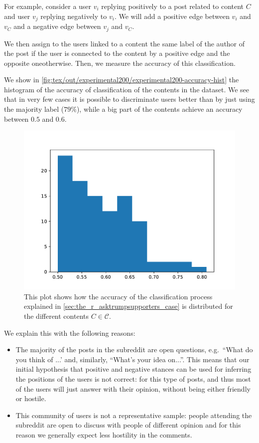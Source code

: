 For example, consider a user $v_i$
replying positively to a post related to content $C$ and user $v_j$ replying
negatively to $v_i$. We will add a positive edge between $v_i$ and $v_C$ and a
negative edge between $v_j$ and $v_C$.

We then assign to the users linked to a content the same label of the author of
the post if the user is connected to the content
by a positive edge and the opposite one\footnotemark otherwise. Then, we measure the accuracy of
this classification.


We show in \autoref{fig:tex/out/experimental200/experimental200-accuracy-hist}
the histogram of the accuracy of classification of the contents in the dataset.
We see that in very few cases it is possible to discriminate users better than
by just using the majority label ($79\%$), while a big part of the contents
achieve an accuracy between $0.5$ and $0.6$.

\begin{figure}
	\centering
	\includegraphics[width=0.6\linewidth]{tex/out/experimental200/experimental200-accuracy-hist.pdf}
	\caption[Distribution of accuracy of classification of r/asktrumpsupporters users for the
		different contents]{This plot shows how the accuracy of the classification
		process explained in \autoref{sec:the_r_asktrumpsupporters_case} is
		distributed for the different contents $C \in \mathcal{C} $.}%
	\label{fig:tex/out/experimental200/experimental200-accuracy-hist}
\end{figure}

We explain this with the following reasons:
\begin{itemize}
	\item The majority of the posts in the subreddit are open questions, e.g.\ ``What
	      do you think of ...' and, similarly, ``What's your idea on...''. This
	      means that our initial hypothesis that positive and negative
	      stances can be used for inferring the positions of
	      the users is not correct: for this type of posts, and thus most of the users
	      will just answer with their opinion, without being either friendly or
	      hostile.
	\item This community of users is not a representative sample: people attending
	      the subreddit are open to discuss with people of different opinion
	      and for this reason we generally expect less hostility in the
	      comments.
\end{itemize}


